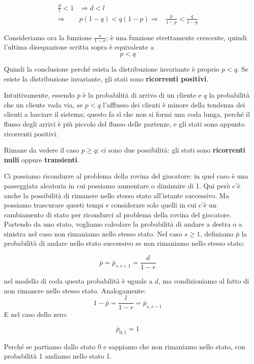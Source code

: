 \documentclass[a4paper,12pt]{book}
\begin{document}
\begin{align}
	\frac{d}{l} < 1 & \Rightarrow d < l \\
	\Rightarrow & p(1-q) < q(1-p)
	\Rightarrow &	\frac{p}{1-p} < \frac{q}{1-q} %
\end{align}

Consideriamo ora la funzione $ \frac{x}{1-x} $; è una funzione strettamente crescente, quindi l'ultima disequazione scritta sopra è equivalente a
$$ p < q $$

Quindi la conclusione perché esista la distribuzione invariante è proprio $ p < q $. Se esiste la distribuzione invariante, gli stati sono \textbf{ricorrenti positivi}. 


Intuitivamente, essendo $ p $ è la probabilità di arrivo di un cliente e $ q $ la probabilità che un cliente vada via, se $ p < q $ l'afflusso dei clienti è minore della tendenza dei clienti a lasciare il sistema; questo fa sì che non si formi una coda lunga, perché il flusso degli arrivi è più piccolo del flusso delle partenze, e gli stati sono appunto ricorrenti positivi. 

Rimane da vedere il caso $ p \ge q $; ci sono due possibilità: gli stati sono \textbf{ricorrenti nulli} oppure \textbf{transienti}. 

Ci possiamo ricondurre al problema della rovina del giocatore: in quel caso è una passeggiata aleatoria in cui possiamo aumentare o diminuire di 1. Qui però c'è anche la possibilità di rimanere nello stesso stato all'istante successivo. 
Ma possiamo trascurare questi tempi e considerare solo quelli in cui c'è un cambiamento di stato per ricondurci al problema della rovina del giocatore. Partendo da uno stato, vogliamo calcolare la probabilità di andare a destra o a sinistra nel caso non rimaniamo nello stesso stato. Nel caso $ s \ge 1 $, definiamo $ \bar{p} $ la probabilità di andare nello stato successivo se non rimaniamo nello stesso stato:

$$ \bar{p}=\bar{p}_{s, s+1} = \frac{d}{1-r}$$

nel modello di coda questa probabilità è uguale a $ d $, ma condizioniamo al fatto di non rimanere nello stesso stato. Analogamente:
$$ 1-\bar{p}= \frac{l}{1-r} = \bar{p}_{s,s-1} $$
E nel caso dello zero:

$$ \bar{p}_{0,1} = 1 $$

Perché se partiamo dallo stato 0 e sappiamo che non rimaniamo nello stato, con probabilità 1 andiamo nello stato 1.
\end{document}
